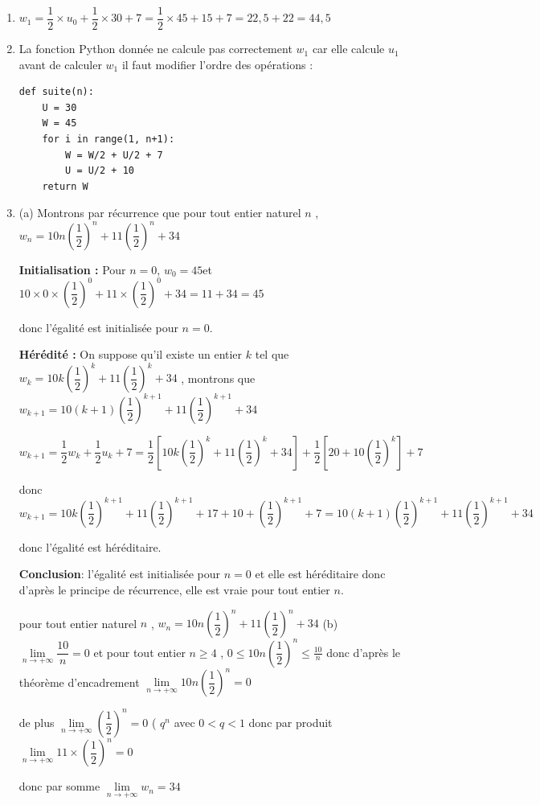 \begin{enumerate}
    \item $w_1= \dfrac{1}{2} \times u_0 + \dfrac{1}{2} \times 30 + 7 = \dfrac{1}{2} \times 45 + 15 + 7 = 22,5 +22 = 44,5$

    \item La fonction Python donnée ne calcule pas correctement \( w_1 \) car elle calcule $u_1$ avant de calculer $w_1$ il faut modifier l’ordre des opérations :
 
\begin{verbatim}
def suite(n):
    U = 30
    W = 45
    for i in range(1, n+1):
        W = W/2 + U/2 + 7
        U = U/2 + 10
    return W
\end{verbatim}

    \item (a) Montrons par récurrence  que pour tout entier naturel $n$ , 
   $ w_n = 10n \left( \dfrac{1}{2} \right)^n + 11 \left( \dfrac{1}{2} \right)^n + 34$

    \textbf{Initialisation :} Pour \( n = 0 \),
    $ w_0 =45 $et $  10 \times 0 \times \left( \dfrac{1}{2} \right)^0 + 11 \times \left( \dfrac{1}{2} \right)^0 + 34 =11+34= 45$

donc l'égalité est initialisée pour $n=0$.

 \textbf{Hérédité :} On suppose qu'il existe un entier $k$ tel que $w_k = 10k \left( \dfrac{1}{2} \right)^k + 11 \left( \dfrac{1}{2} \right)^k + 34$ , montrons que  $w_{k+1} = 10(k+1) \left( \dfrac{1}{2} \right)^{k+1} + 11 \left( \dfrac{1}{2} \right)^{k+1} + 34$

$ w_{k+1} = \dfrac{1}{2}w_k + \dfrac{1}{2}u_k + 7 = \dfrac{1}{2} \left[ 10k \left( \dfrac{1}{2} \right)^k + 11 \left( \dfrac{1}{2} \right)^k + 34 \right] + \dfrac{1}{2} \left[ 20 + 10 \left( \dfrac{1}{2} \right)^k \right] + 7$

donc $ w_{k+1} = 10k \left( \dfrac{1}{2} \right)^{k+1} + 11 \left( \dfrac{1}{2} \right)^{k+1} + 17 +10 +   \left( \dfrac{1}{2} \right)^{k+1}+ 7 = 10(k+1) \left( \dfrac{1}{2} \right)^{k+1} + 11 \left( \dfrac{1}{2} \right)^{k+1} + 34$

donc l'égalité est héréditaire.

\textbf{Conclusion}: l'égalité est initialisée pour $n=0$ et elle est héréditaire donc d'après le principe de récurrence, elle est vraie pour tout entier $n$.

pour tout entier naturel $n$ , $ w_n = 10n \left( \dfrac{1}{2} \right)^n + 11 \left( \dfrac{1}{2} \right)^n + 34$
 (b)  $\lim\limits_{n \to +\infty} \dfrac{10}{n}=0$ et pour tout entier $n \geqslant 4$ , $0 \leqslant 10n \left( \dfrac{1}{2} \right)^n \leqslant \frac{10}{n}$ donc d'après le théorème d'encadrement $\lim\limits_{n \to +\infty}10n \left( \dfrac{1}{2} \right)^n=0$ 

de plus $\lim\limits_{n \to +\infty}  \left( \dfrac{1}{2} \right)^n =0$ ( $q^n$ avec $0<q<1$ donc par produit $\lim\limits_{n \to +\infty} 11 \times  \left( \dfrac{1}{2} \right)^n =0$

donc par somme $\lim\limits_{n \to +\infty} w_n=34$
\end{enumerate}

\bigskip
